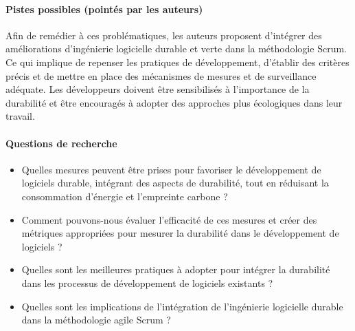 \paragraph{Pistes possibles (pointés par les auteurs)}
Afin de remédier à ces problématiques, les auteurs proposent d’intégrer des améliorations d’ingénierie logicielle durable et verte dans la méthodologie Scrum. Ce qui implique de repenser les pratiques de développement, d’établir des critères précis et de mettre en place des mécanismes de mesures et de surveillance adéquate. Les développeurs doivent être sensibilisés à l'importance de la durabilité et être encouragés à adopter des approches plus écologiques dans leur travail.

\paragraph{Questions de recherche}
\begin{itemize}
    \item Quelles mesures peuvent être prises pour favoriser le développement de logiciels durable, intégrant des aspects de durabilité, tout en réduisant la consommation d'énergie et l'empreinte carbone ?
    \item Comment pouvons-nous évaluer l'efficacité de ces mesures et créer des métriques appropriées pour mesurer la durabilité dans le développement de logiciels ?
    \item Quelles sont les meilleures pratiques à adopter pour intégrer la durabilité dans les processus de développement de logiciels existants ?
    \item Quelles sont les implications de l'intégration de l'ingénierie logicielle durable dans la méthodologie agile Scrum ?
\end{itemize}

